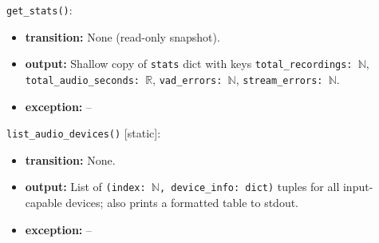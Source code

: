 \documentclass[12pt, titlepage]{article}
\begin{document}
\noindent\texttt{get\_stats()}:
\begin{itemize}
  \item \textbf{transition:} None (read-only snapshot).
  \item \textbf{output:} Shallow copy of \texttt{stats} dict with keys \texttt{total\_recordings: $\mathbb{N}$}, \texttt{total\_audio\_seconds: $\mathbb{R}$}, \texttt{vad\_errors: $\mathbb{N}$}, \texttt{stream\_errors: $\mathbb{N}$}.
  \item \textbf{exception:} --
\end{itemize}

\noindent\texttt{list\_audio\_devices()} [static]:
\begin{itemize}
  \item \textbf{transition:} None.
  \item \textbf{output:} List of \texttt{(index: $\mathbb{N}$, device\_info: dict)} tuples for all input-capable devices; also prints a formatted table to stdout.
  \item \textbf{exception:} --
\end{itemize}
\end{document}
